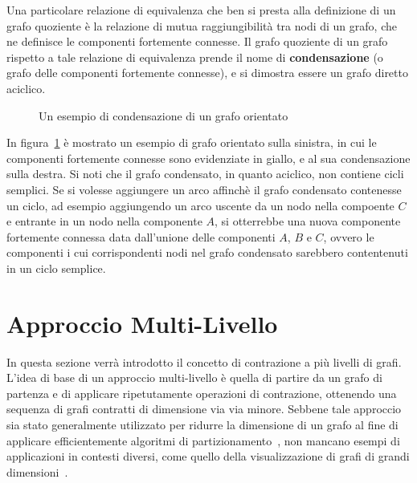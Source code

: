Una particolare relazione di equivalenza che ben si presta alla definizione di un grafo quoziente \`e la relazione di
mutua raggiungibilit\`a tra nodi di un grafo, che ne definisce le componenti fortemente connesse.
Il grafo quoziente di un grafo rispetto a tale relazione di equivalenza prende il nome di
\textbf{condensazione} (o grafo delle componenti fortemente connesse), e si dimostra essere un grafo diretto aciclico.

\begin{figure}[h]
    \centering
    
    \caption{Un esempio di condensazione di un grafo orientato}
    \label{fig:condensation-example}
\end{figure}

In figura~\ref{fig:condensation-example} \`e mostrato un esempio di grafo orientato sulla sinistra, in cui le componenti
fortemente connesse sono evidenziate in giallo, e al sua condensazione sulla destra. \newline
Si noti che il grafo condensato, in quanto aciclico, non contiene cicli semplici. \newline
Se si volesse aggiungere un arco affinch\`e il grafo condensato contenesse un ciclo, ad esempio aggiungendo un arco
uscente da un nodo nella compoente $C$ e entrante in un nodo nella componente $A$, si otterrebbe una nuova componente
fortemente connessa data dall'unione delle componenti $A$, $B$ e $C$, ovvero le componenti i cui corrispondenti nodi
nel grafo condensato sarebbero contentenuti in un ciclo semplice. \newline


\section{Approccio Multi-Livello}\label{sec:approccio-multi-livello}
In questa sezione verr\`a introdotto il concetto di contrazione a pi\`u livelli di grafi. \newline
L'idea di base di un approccio multi-livello \`e quella di partire da un grafo di partenza e di applicare
ripetutamente operazioni di contrazione, ottenendo una sequenza di grafi contratti di dimensione via via minore.
Sebbene tale approccio sia stato generalmente utilizzato per ridurre la dimensione di un grafo al fine di
applicare efficientemente algoritmi di partizionamento~\cite{DBLP:journals/corr/abs-1012-0006},
non mancano esempi di applicazioni in contesti diversi, come quello della visualizzazione di grafi di grandi
dimensioni~\cite{4069239}. \newline

